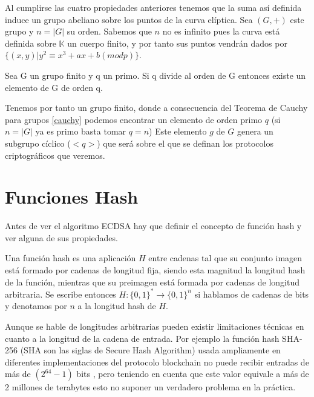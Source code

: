 Al cumplirse las cuatro propiedades anteriores tenemos que la suma así definida induce un grupo abeliano sobre los puntos de la curva elíptica. Sea $(G,+)$ este grupo y $n=|G|$ su orden. Sabemos que $n$ no es infinito pues la curva está definida sobre $\mathbb{K}$ un cuerpo finito, y por tanto sus puntos vendrán dados por $\{(x,y)| y^2 \equiv x^3 + ax + b  (mod  p) \}$. 
\theoremstyle{theorem}\begin{theorem}\label{cauchy} Sea G un grupo finito y q un primo. Si q divide al orden de G entonces existe un elemento de G de orden q.
\end{theorem}
Tenemos por tanto un grupo finito, donde a consecuencia del Teorema de Cauchy para grupos \ref{cauchy} podemos encontrar un elemento de orden primo $q$ (si $n = |G|$ ya es primo basta tomar $q = n$) Este elemento $g$ de $G$ genera un subgrupo cíclico ($<q>$) que será sobre el que se definan los protocolos criptográficos que veremos.



\section{Funciones Hash}\label{hash}
Antes de ver el algoritmo ECDSA hay que definir el concepto de función hash y ver alguna de sus propiedades.
\theoremstyle{definition}\begin{definition}\label{hash_def} Una función hash es una aplicación $\textit{H}$ entre cadenas tal que su conjunto imagen está formado por cadenas de longitud fija, siendo esta magnitud la longitud hash de la función, mientras que su preimagen está formada por cadenas de longitud arbitraria. Se escribe entonces $\textit{H}: \{0,1\}^* \rightarrow \{0,1\}^n$ si hablamos de cadenas de bits y denotamos por $n$ a la longitud hash de $\textit{H}$.\end{definition}

Aunque se hable de longitudes arbitrarias pueden existir limitaciones técnicas en cuanto a la longitud de la cadena de entrada. Por ejemplo la función hash SHA-256 (SHA son las siglas de Secure Hash Algorithm) usada ampliamente en diferentes implementaciones del protocolo blockchain no puede recibir entradas de más de $(2^{64} -1)$ bits \citep{sha-256}, pero teniendo en cuenta que este valor equivale a más de 2 millones de terabytes esto no suponer un verdadero problema en la práctica.

